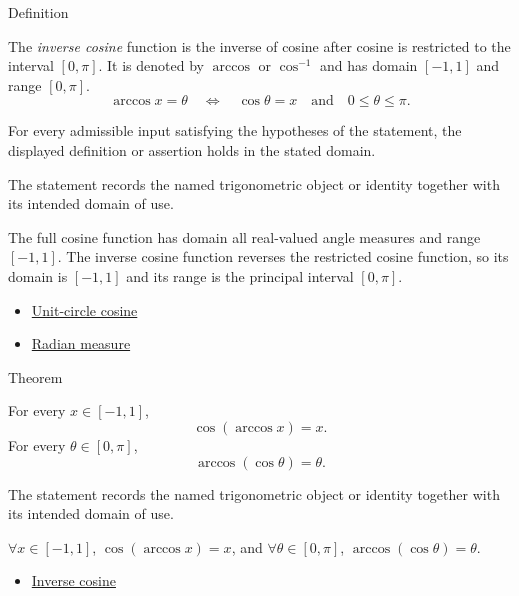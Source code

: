 

\begin{definitionbox}{Definition}
\begin{definition}
\label{def:inverse-cosine}
The \emph{inverse cosine} function is the inverse of cosine after cosine is
restricted to the interval $[0,\pi]$. It is denoted by $\arccos$ or
$\cos^{-1}$ and has domain $[-1,1]$ and range $[0,\pi]$.
\[
  \arccos x=\theta
  \quad\Longleftrightarrow\quad
  \cos\theta=x
  \quad\text{and}\quad
  0\leq\theta\leq\pi.
\]
\end{definition}
\end{definitionbox}
\begin{remark*}
For every admissible input satisfying the hypotheses of the statement, the
displayed definition or assertion holds in the stated domain.
\end{remark*}

\begin{remark*}[Interpretation]
The statement records the named trigonometric object or identity together with
its intended domain of use.
\end{remark*}

\begin{remark*}
The full cosine function has domain all real-valued angle measures and range
$[-1,1]$. The inverse cosine function reverses the restricted cosine function,
so its domain is $[-1,1]$ and its range is the principal interval $[0,\pi]$.
\end{remark*}
\begin{dependencies}
\begin{itemize}
  \item \hyperref[def:unit-circle-cosine]{Unit-circle cosine}
  \item \hyperref[def:radian-measure]{Radian measure}
\end{itemize}
\end{dependencies}

\begin{theorembox}{Theorem}
\begin{theorem}
\label{thm:inverse-cosine-identities}
For every $x\in[-1,1]$,
\[
  \cos(\arccos x)=x.
\]
For every $\theta\in[0,\pi]$,
\[
  \arccos(\cos\theta)=\theta.
\]
\end{theorem}
\end{theorembox}
\begin{remark*}[Interpretation]
The statement records the named trigonometric object or identity together with
its intended domain of use.
\end{remark*}

\begin{remark*}
$\forall x\in[-1,1]$, $\cos(\arccos x)=x$, and
$\forall \theta\in[0,\pi]$, $\arccos(\cos\theta)=\theta$.
\end{remark*}
\begin{dependencies}
\begin{itemize}
  \item \hyperref[def:inverse-cosine]{Inverse cosine}
\end{itemize}
\end{dependencies}
